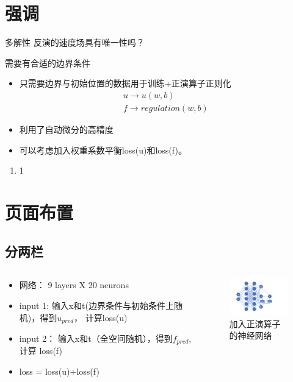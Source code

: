 \section{强调}
\begin{frame}
	\begin{block}{多解性}
		反演的速度场具有唯一性吗？
	
		\qquad
	

		需要有合适的边界条件	
	\end{block}
	\begin{itemize}
		\item 只需要边界与初始位置的数据用于训练+正演算子正则化
		\begin{gather*}
			u \longrightarrow u(w,b)\\
			f \longrightarrow regulation (w,b)
		\end{gather*}

		\item 利用了自动微分的高精度
		\item 可以考虑加入权重系数平衡loss(u)和loss(f)。

	\end{itemize}
	\begin{enumerate}
		\item 1
	\end{enumerate}
\end{frame}

\section{页面布置}
\subsection{分两栏}
\begin{frame}
	\begin{columns}
		\begin{column}{0.6\linewidth}
			\begin{itemize}
			\item 网络： 9 layers X 20 neurons 
			\item input 1: 输入x和t(边界条件与初始条件上随机)，得到$u_{pred}$， 计算loss(u) 
			\item input 2： 输入x和t（全空间随机），得到$f_{pred}$, 计算 loss(f) 
			\item loss = loss(u)+loss(f)
			\end{itemize}
		\end{column}
		
		\begin{column}{0.45\linewidth}
			\begin{figure}[h]
				\centering
				\includegraphics[width=5cm]{./imags/flower.png}
				\caption{加入正演算子的神经网络}
			\end{figure}
		\end{column}
	\end{columns}
\end{frame}
